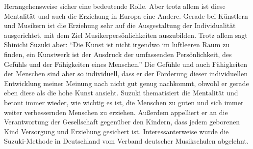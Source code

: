 Herangehensweise sicher eine bedeutende Rolle. Aber trotz allem ist diese
Mentalität und auch die Erziehung in Europa eine Andere. Gerade bei Künstlern
und Musikern ist die Erziehung sehr auf die Ausgestaltung der Individualität
ausgerichtet, mit dem Ziel Musikerpersönlichkeiten auszubilden. Trotz allem sagt
Shinichi Suzuki aber: \enquote{Die Kunst ist nicht irgendwo im luftleeren Raum
zu finden, ein Kunstwerk ist der Ausdruck der umfassenden Persönlichkeit, des
Gefühls und der Fähigkeiten eines Menschen.}
\autocite[103]{suzuki:erziehung_ist_liebe} Die Gefühle und auch Fähigkeiten der
Menschen sind aber so individuell, dass er der Förderung dieser individuellen
Entwicklung meiner Meinung nach nicht gut genug nachkommt, obwohl er gerade eben
diese als die hohe Kunst ansieht. Suzuki thematisiert die Mentalität und betont
immer wieder, wie wichtig es ist, die Menschen zu guten und sich immer weiter
verbessernden Menschen zu erziehen. Außerdem appelliert er an die Verantwortung
der Gesellschaft gegenüber den Kindern, dass jedem geborenen Kind Versorgung und
Erziehung gesichert ist. \autocite[130]{suzuki:erziehung_ist_liebe}
Interessanterweise wurde die Suzuki-Methode in Deutschland vom Verband deutscher
Musikschulen abgelehnt. \autocite[49]{ernst:die_zukunftsfaehige_musikschule}

